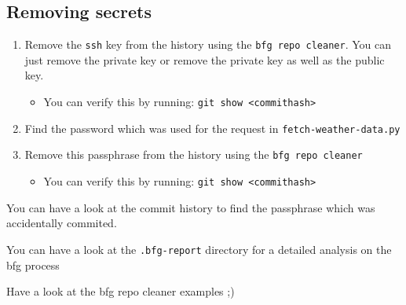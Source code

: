 \documentclass[paper=a4]{scrartcl}
\begin{document}
	\subsection*{Removing secrets}
		\begin{enumerate}
			\item Remove the \texttt{ssh} key from the history using the \texttt{bfg repo cleaner}. You can just remove the private key or remove the private key as well as the public key.
				\begin{itemize}
					\item 	You can verify this by running: \texttt{git show <commithash>}
				\end{itemize}
			\item Find the password which was used for the request in \texttt{fetch-weather-data.py}
			\item Remove this passphrase from the history using the \texttt{bfg repo cleaner}
				\begin{itemize}
					\item 	You can verify this by running: \texttt{git show <commithash>}
				\end{itemize}
		\end{enumerate}

	\begin{hints}
  		\item 	You can have a look at the commit history to find the passphrase which was accidentally commited.
  		\item 	You can have a look at the \texttt{.bfg-report} directory for a detailed analysis on the bfg process
  		\item 	Have a look at the bfg repo cleaner examples ;)
	\end{hints}

\end{document}
